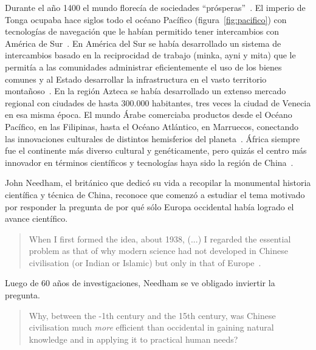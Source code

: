 \documentclass[a4paper,11pt]{book}
\theoremstyle{definition}
\begin{document}
Durante el a\~no 1400 el mundo florec\'ia de sociedades ``pr\'osperas''~\cite{dussel2004}.
%
El imperio de Tonga ocupaba hace siglos todo el oc\'eano Pac\'ifico (figura~\ref{fig:pacifico}) con tecnolog\'ias de navegaci\'on que le hab\'ian permitido tener intercambios con Am\'erica de Sur~\cite{thorsby2016-polynesiaAmerica, ioannidis2020-polynesiaAmerica}.
%
En Am\'erica del Sur se hab\'ia desarrollado un sistema de intercambios basado en la reciprocidad de trabajo (minka, ayni y mita) que le permit\'ia a las comunidades administrar eficientemente el uso de los bienes comunes y al Estado desarrollar la infrastructura en el vasto territorio monta\~noso~\cite{murra1978-organizacion}.
%
En la regi\'on Azteca se hab\'ia desarrollado un extenso mercado regional con ciudades de hasta 300.000 habitantes, tres veces la ciudad de Venecia en esa misma \'epoca.
%
El mundo \'Arabe comerciaba productos desde el Oc\'eano Pac\'ifico, en las Filipinas, hasta el Oc\'eano Atl\'antico, en Marruecos, conectando las innovaciones culturales de distintos hemisferios del planeta~\cite{dussel2004}.
%
\'Africa siempre fue el continente m\'as diverso cultural y gen\'eticamente, pero quiz\'as el centro m\'as innovador en t\'erminos cient\'ificos y tecnolog\'ias haya sido la regi\'on de China~\cite{needham2004-generalConclusionsAndReflections}.


John Needham, el brit\'anico que dedic\'o su vida a recopilar la monumental historia cient\'ifica y t\'ecnica de China, reconoce que comenz\'o a estudiar el tema motivado por responder la pregunta de por qu\'e s\'olo Europa occidental hab\'ia logrado el avance cient\'ifico.
%
\begin{quotation}
When I first formed the idea, about 1938, (...) I regarded the essential problem as that of why modern science had not developed in Chinese civilisation (or Indian or Islamic) but only in that of Europe~\cite{needham2004-generalConclusionsAndReflections}.%
\end{quotation}
Luego de 60 a\~nos de investigaciones, Needham se ve obligado inviertir la pregunta.
\begin{quotation}
Why, between the -1th century and the 15th century, was Chinese civilisation much \emph{more} efficient than occidental in gaining natural knowledge and in applying it to practical human needs?~\cite{needham2004-generalConclusionsAndReflections}
\end{quotation}

\end{document}
